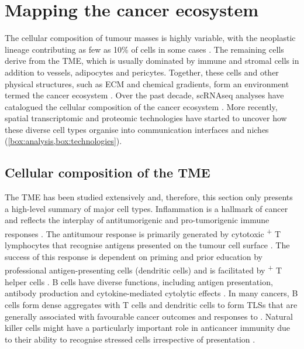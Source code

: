 \section{Mapping the cancer ecosystem}
\label{sec:mapping-the-cancer-ecosystem}
The cellular composition of tumour masses is highly variable, with the neoplastic lineage contributing as few as 10\% of cells in some cases \parencite{Aran2015-dw}. The remaining cells derive from the TME, which is usually dominated by immune and stromal cells in addition to vessels, adipocytes and pericytes. Together, these cells and other physical structures, such as \ac{ECM} and chemical gradients, form an environment termed the cancer ecosystem \parencite{Somarelli2021-va}. Over the past decade, \ac{scRNAseq} analyses have catalogued the cellular composition of the cancer ecosystem \parencite{Darmanis2017-yb,Venteicher2017-mo,Pombo_Antunes2021-md,Puram2017-mn,Tirosh2016-rl,Izar2020-tf,Lambrechts2018-hx,Chung2017-ic}. More recently, spatial transcriptomic and proteomic technologies have started to uncover how these diverse cell types organise into communication interfaces and niches \parencite{Schapiro2017-gy,Arnol2019-fv} (\cref{box:analysis,box:technologies}).

\subsection*{Cellular composition of the \acs{TME}}
The \ac{TME} has been studied extensively and, therefore, this section only presents a high-level summary of major cell types. Inflammation is a hallmark of cancer \parencite{Hanahan2011-cd} and reflects the interplay of antitumorigenic and pro-tumorigenic immune responses . The antitumour response is primarily generated by cytotoxic \textsuperscript{+} T lymphocytes that recognise antigens presented on the tumour cell surface \parencite{Raskov2021-gb,Philip2022-ly}. The success of this response is dependent on priming and prior education by professional antigen-presenting cells (dendritic cells) and is facilitated by \textsuperscript{+} T helper cells \parencite{Borst2018-tp,Waldman2020-kf}. B cells have diverse functions, including antigen presentation, antibody production and cytokine-mediated cytolytic effects \parencite{Sharonov2020-vx}. In many cancers, B cells form dense aggregates with T cells and dendritic cells to form \acp{TLS} \parencite{Schumacher2022-mr} that are generally associated with favourable cancer outcomes and responses to  \parencite{Sautes-Fridman2019-nl}. Natural killer cells might have a particularly important role in anticancer immunity due to their ability to recognise stressed cells irrespective of  presentation \parencite{Wolf2023-hu}.

